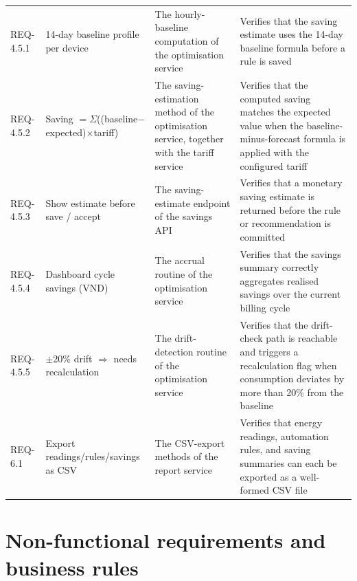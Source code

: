 \begin{longtable}{@{}L{1.7cm} L{4.3cm} L{4.4cm} L{3.4cm}@{}}
REQ-4.5.1 & 14-day baseline profile per device & The hourly-baseline computation of the optimisation service & Verifies that the saving estimate uses the 14-day baseline formula before a rule is saved \\
REQ-4.5.2 & Saving $= \Sigma$((baseline$-$expected)$\times$tariff) & The saving-estimation method of the optimisation service, together with the tariff service & Verifies that the computed saving matches the expected value when the baseline-minus-forecast formula is applied with the configured tariff \\
REQ-4.5.3 & Show estimate before save / accept & The saving-estimate endpoint of the savings API & Verifies that a monetary saving estimate is returned before the rule or recommendation is committed \\
REQ-4.5.4 & Dashboard cycle savings (VND) & The accrual routine of the optimisation service & Verifies that the savings summary correctly aggregates realised savings over the current billing cycle \\
REQ-4.5.5 & $\pm$20\% drift $\Rightarrow$ needs recalculation & The drift-detection routine of the optimisation service & Verifies that the drift-check path is reachable and triggers a recalculation flag when consumption deviates by more than 20\% from the baseline \\
REQ-6.1 & Export readings/rules/savings as CSV & The CSV-export methods of the report service & Verifies that energy readings, automation rules, and saving summaries can each be exported as a well-formed CSV file \\
\end{longtable}

\section{Non-functional requirements and business rules}


